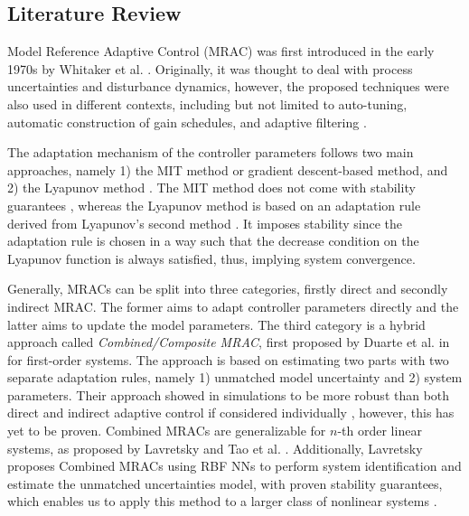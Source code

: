 \subsection{Literature Review}
\label{sec:related-work}
Model Reference Adaptive Control (MRAC) was first introduced in the early 1970s by Whitaker et al. \cite{whitakerDesignModelReference1958}. Originally, it was thought to deal with process uncertainties and disturbance dynamics, however, the proposed techniques were also used in different contexts, including but not limited to auto-tuning, automatic construction of gain schedules, and adaptive filtering \cite{astromTheoryApplicationsAdaptive1983, astromHistoryAdaptiveControl2014}.

The adaptation mechanism of the controller parameters follows two main approaches, namely 1) the MIT method or gradient descent-based method, and 2) the Lyapunov method \cite{astromAdaptiveControl2008}. The MIT method does not come with stability guarantees \cite{mareelsRevisitingMitRule1987}, whereas the Lyapunov method is based on an adaptation rule derived from Lyapunov's second method \cite{shackclothSynthesisModelReference1965}. It imposes stability since the adaptation rule is chosen in a way such that the decrease condition on the Lyapunov function is always satisfied, thus, implying system convergence.

Generally, MRACs can be split into three categories, firstly direct and secondly indirect MRAC. The former aims to adapt controller parameters directly and the latter aims to update the model parameters. The third category is a hybrid approach called \textit{Combined/Composite MRAC}, first proposed by Duarte et al. in \cite{duarteCombinedDirectIndirect1989} for first-order systems. The approach is based on estimating two parts with two separate adaptation rules, namely 1) unmatched model uncertainty and 2) system parameters. Their approach showed in simulations to be more robust than both direct and indirect adaptive control if considered individually \cite{narendraRobustAdaptiveControl1988}, however, this has yet to be proven. Combined MRACs are generalizable for $n$-th order linear systems, as proposed by Lavretsky and Tao et al. \cite{taoAdaptiveControlSystems2013}. Additionally, Lavretsky proposes Combined MRACs using RBF NNs to perform system identification and estimate the unmatched uncertainties model, with proven stability guarantees, which enables us to apply this method to a larger class of nonlinear systems \cite{lavretskyCombinedCompositeModel2009}.

